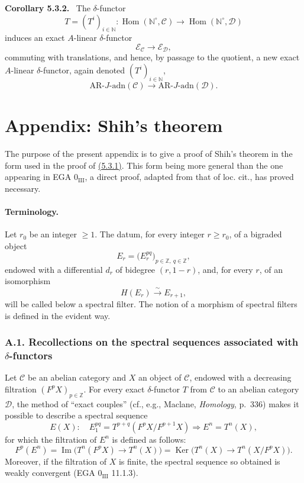 \documentclass[11pt]{article}
\newenvironment{statement}[1]{\par\medskip\noindent\textbf{#1.}\ }{\par\medskip}
\DeclareMathOperator{\Hom}{Hom}
\providecommand{\Ker}{\operatorname{Ker}}
\providecommand{\Hom}{\operatorname{Hom}}
\providecommand{\Im}{\operatorname{Im}}
\providecommand{\Ker}{\operatorname{Ker}}
\renewcommand{\Im}{\operatorname{Im}}
\providecommand{\Ker}{\operatorname{Ker}}
\providecommand{\Im}{\operatorname{Im}}
\providecommand{\Hom}{\operatorname{Hom}}
\begin{document}
\label{sga5:V:corollary:5.3.2}\begin{statement}{Corollary 5.3.2}
The \(\delta\)-functor
\[
T=(T^i)_{i\in\mathbb N}:\Hom(\mathbb N^\circ,\mathcal C)\longrightarrow\Hom(\mathbb N^\circ,\mathcal D)
\]
induces an exact \(A\)-linear \(\delta\)-functor
\[
\mathcal E_{\mathcal C}\longrightarrow\mathcal E_{\mathcal D},
\]
commuting with translations, and hence, by passage to the quotient, a new exact \(A\)-linear \(\delta\)-functor, again denoted \((T^i)_{i\in\mathbb N}\),
\[
\mathrm{AR}\text{-}J\text{-adn}(\mathcal C)\longrightarrow
\mathrm{AR}\text{-}J\text{-adn}(\mathcal D).
\]
\end{statement}

\section*{Appendix: Shih's theorem}

The purpose of the present appendix is to give a proof of Shih's theorem in the form used in the proof of \hyperref[sga5:V:proposition:5.3.1]{(5.3.1)}. This form being more general than the one appearing in EGA \(0_{\mathrm{III}}\), a direct proof, adapted from that of loc. cit., has proved necessary.

\paragraph{Terminology.}
Let \(r_0\) be an integer \(\ge1\). The datum, for every integer \(r\ge r_0\), of a bigraded object
\[
E_r=\bigl(E_r^{pq}\bigr)_{p\in\mathbb Z,\ q\in\mathbb Z},
\]
endowed with a differential \(d_r\) of bidegree \((r,1-r)\), and, for every \(r\), of an isomorphism
\[
H(E_r)\xrightarrow{\sim}E_{r+1},
\]
will be called below a spectral filter. The notion of a morphism of spectral filters is defined in the evident way.

\subsubsection*{A.1. Recollections on the spectral sequences associated with \(\delta\)-functors}\label{sga5:V:subsubsection:a.1}

Let \(\mathcal C\) be an abelian category and \(X\) an object of \(\mathcal C\), endowed with a decreasing filtration \((F^pX)_{p\in\mathbb Z}\). For every exact \(\delta\)-functor \(T\) from \(\mathcal C\) to an abelian category \(\mathcal D\), the method of “exact couples” (cf., e.g., Maclane, \emph{Homology}, p.~336) makes it possible to describe a spectral sequence
\[
E(X):\quad E_1^{pq}=T^{p+q}(F^pX/F^{p+1}X)\Rightarrow E^n=T^n(X),
\]
for which the filtration of \(E^n\) is defined as follows:
\[
F^p(E^n)=\Im\bigl(T^n(F^pX)\longrightarrow T^n(X)\bigr)
=\Ker\bigl(T^n(X)\longrightarrow T^n(X/F^pX)\bigr).
\]
Moreover, if the filtration of \(X\) is finite, the spectral sequence so obtained is weakly convergent (EGA \(0_{\mathrm{III}}\) 11.1.3).
\end{document}
